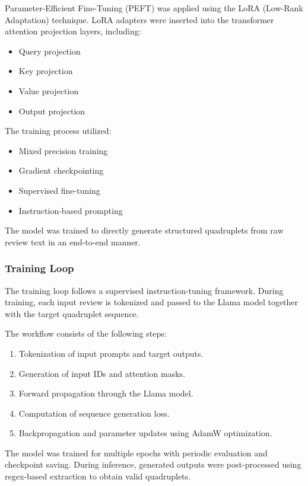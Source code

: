 \documentclass{article}
\begin{document}
Parameter-Efficient Fine-Tuning (PEFT) was applied using the LoRA (Low-Rank Adaptation) technique. LoRA adapters were inserted into the transformer attention projection layers, including:
\begin{itemize}
    \item Query projection
    \item Key projection
    \item Value projection
    \item Output projection
\end{itemize}

The training process utilized:
\begin{itemize}
    \item Mixed precision training
    \item Gradient checkpointing
    \item Supervised fine-tuning
    \item Instruction-based prompting
\end{itemize}

The model was trained to directly generate structured quadruplets from raw review text in an end-to-end manner.

\subsubsection{Training Loop}

The training loop follows a supervised instruction-tuning framework. During training, each input review is tokenized and passed to the Llama model together with the target quadruplet sequence.

The workflow consists of the following steps:
\begin{enumerate}
    \item Tokenization of input prompts and target outputs.
    \item Generation of input IDs and attention masks.
    \item Forward propagation through the Llama model.
    \item Computation of sequence generation loss.
    \item Backpropagation and parameter updates using AdamW optimization.
\end{enumerate}

The model was trained for multiple epochs with periodic evaluation and checkpoint saving. During inference, generated outputs were post-processed using regex-based extraction to obtain valid quadruplets.
\end{document}
